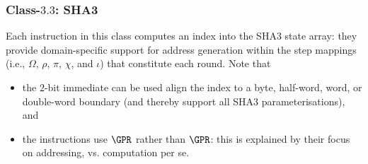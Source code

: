 



\subsubsection{Class-$3.3$: SHA3}
\label{sec:spec:instruction:3:3}

Each instruction in this class computes an index into the SHA3 state array:
they provide domain-specific support for address generation within the step
mappings~\cite[Section 3.2]{SCARV:FIPS:202} (i.e., $\Omega$, $\rho$, $\pi$, 
$\chi$, and $\iota$) that constitute each round.  Note that

\begin{itemize}
\item the $2$-bit immediate  can be used align the index 
      to a byte, half-word, word, or double-word boundary 
      (and thereby support all SHA3 parameterisations), 
      and
\item the instructions use $\GPR$ rather than $\GPR$: this is explained by
      their focus on addressing, vs. computation per se.
\end{itemize}



